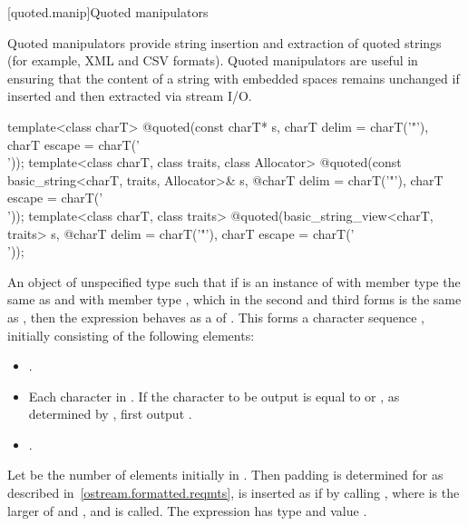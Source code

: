 [quoted.manip]{Quoted manipulators}

\pnum
\begin{note}
Quoted manipulators provide string insertion and extraction of quoted strings (for example, XML and CSV formats). Quoted manipulators are useful in ensuring that the content of a string with embedded spaces remains unchanged if inserted and then extracted via stream I/O.
\end{note}

%
\begin{itemdecl}
template<class charT>
  @\unspec@ quoted(const charT* s, charT delim = charT('"'), charT escape = charT('\\'));
template<class charT, class traits, class Allocator>
  @\unspec@ quoted(const basic_string<charT, traits, Allocator>& s,
  @\itcorr@                   charT delim = charT('"'), charT escape = charT('\\'));
template<class charT, class traits>
  @\unspec@ quoted(basic_string_view<charT, traits> s,
  @\itcorr@                   charT delim = charT('"'), charT escape = charT('\\'));
\end{itemdecl}

\begin{itemdescr}
\pnum
\returns
An object of unspecified type such that if  is an instance
of  with member type  the same as
 and with member type , which in the second and third
forms is the same as , then the expression
behaves as a 
of . This forms a character sequence , initially
consisting of the following elements:
\begin{itemize}
\item {}.
\item Each character in . If the character to be output is equal to
 or , as determined by , first
output .
\item {}.
\end{itemize}
Let  be the number of elements initially in .
Then padding is determined for  as described
in~\ref{ostream.formatted.reqmts},  is inserted as if by calling
, where  is the larger of
 and , and  is called.
The expression  has type
 and value .
\end{itemdescr}

